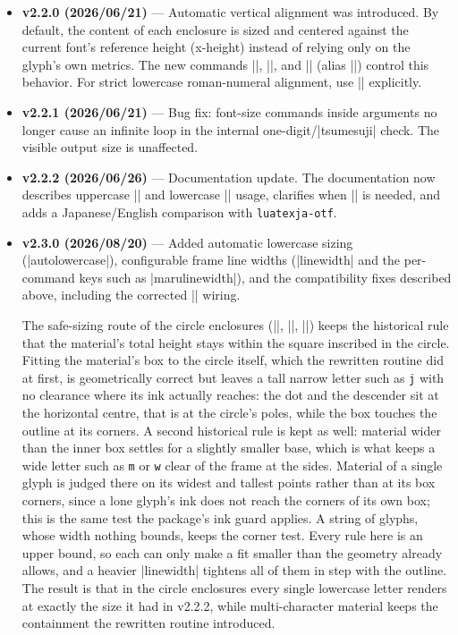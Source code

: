 \documentclass[luatex,fontsize=8pt,paper=b5,twoside]{jlreq}%
\begin{document}
\begin{itemize}
  \item \textbf{v2.2.0 (2026/06/21)} --- Automatic vertical alignment was introduced. By default, the content of each enclosure is sized and centered against the current font's reference height (x-height) instead of relying only on the glyph's own metrics. The new commands \KKverb|\kksref|, \KKverb|\kksrefoff|, and \KKverb|\kksrefauto| (alias \KKverb|\kksrefreset|) control this behavior. For strict lowercase roman-numeral alignment, use \KKverb|| explicitly.
  \item \textbf{v2.2.1 (2026/06/21)} --- Bug fix: font-size commands inside arguments no longer cause an infinite loop in the internal one-digit/\KKverb|tsumesuji| check. The visible output size is unaffected.
  \item \textbf{v2.2.2 (2026/06/26)} --- Documentation update. The documentation now describes uppercase \KKverb|| and lowercase \KKverb|| usage, clarifies when \KKverb|| is needed, and adds a Japanese/English comparison with \texttt{luatexja-otf}.
  \item \textbf{v2.3.0 (2026/08/20)} --- Added automatic lowercase sizing (\KKverb|autolowercase|), configurable frame line widths (\KKverb|linewidth| and the per-command keys such as \KKverb|marulinewidth|), and the compatibility fixes described above, including the corrected \KKverb|\maruhishi| wiring.

  The safe-sizing route of the circle enclosures (\KKverb|\maru|, \KKverb|\kuromaru|, \KKverb|\nmaru|) keeps the historical rule that the material's total height stays within the square inscribed in the circle. Fitting the material's box to the circle itself, which the rewritten routine did at first, is geometrically correct but leaves a tall narrow letter such as \verb|j| with no clearance where its ink actually reaches: the dot and the descender sit at the horizontal centre, that is at the circle's poles, while the box touches the outline at its corners. A second historical rule is kept as well: material wider than the inner box settles for a slightly smaller base, which is what keeps a wide letter such as \verb|m| or \verb|w| clear of the frame at the sides. Material of a single glyph is judged there on its widest and tallest points rather than at its box corners, since a lone glyph's ink does not reach the corners of its own box; this is the same test the package's ink guard applies. A string of glyphs, whose width nothing bounds, keeps the corner test. Every rule here is an upper bound, so each can only make a fit smaller than the geometry already allows, and a heavier \KKverb|linewidth| tightens all of them in step with the outline. The result is that in the circle enclosures every single lowercase letter renders at exactly the size it had in v2.2.2, while multi-character material keeps the containment the rewritten routine introduced.


\end{itemize}
\end{document}
